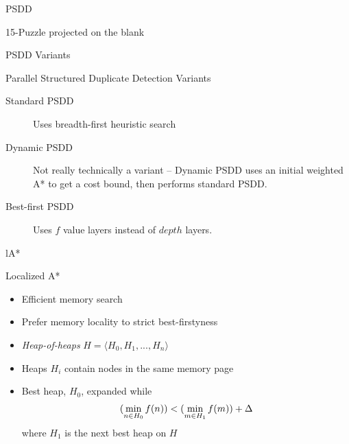 \documentclass[style=unh]{powerdot}
\begin{document}
\begin{slide}{PSDD}
   {
    \vspace{-.3in}
    \begin{center}
      15-Puzzle projected on the blank
    \end{center}
  }

\end{slide}

\begin{slide}{PSDD Variants}
  \vspace{.2in}
  \begin{center}
    Parallel Structured Duplicate Detection Variants
  \end{center}

  \begin{description}

  \item[Standard PSDD]
    Uses breadth-first heuristic search
  \item[Dynamic PSDD]
    Not really technically a variant -- Dynamic PSDD uses an initial
    weighted A* to get a cost bound, then performs standard PSDD.
  \item[Best-first PSDD]
    Uses $f$ value layers instead of $depth$ layers.
  \end{description}

\end{slide}


\begin{slide}{lA*}
  \vspace{.2in}
  \begin{center}
    Localized A*
  \end{center}

  \begin{itemize}
  \item Efficient memory search
  \item Prefer memory locality to strict best-firstyness
  \item \emph{Heap-of-heaps} $H = \langle H_0, H_1, ..., H_n \rangle$
  \item Heaps $H_i$ contain nodes in the same memory page
  \item Best heap, $H_0$, expanded while
    \begin{eqnarray*}
      (\mathop{\rm min}_{n \in H_0} f(n)) < (\mathop{\rm min}_{m \in H_1} f(m)) + \Delta
    \end{eqnarray*}
    where $H_1$ is the next best heap on $H$
  \end{itemize}

\end{slide}
\end{document}
